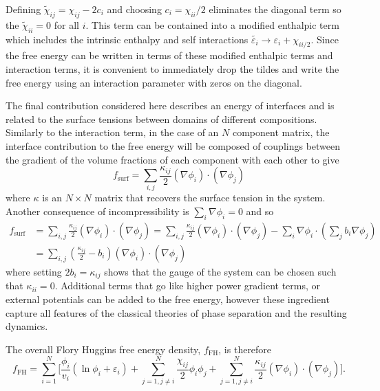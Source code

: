 Defining $\tilde{\chi}_{ij}=\chi_{ij}-2c_i$ and choosing $c_i = \chi_{ii}/2$ eliminates the diagonal term so the $\tilde{\chi}_{ii} = 0$ for all $i$. This term can be contained into a modified enthalpic term which includes the intrinsic enthalpy and self interactions $\tilde{\varepsilon_i} \rightarrow \varepsilon_i + \chi_{ii/2}$. Since the free energy can be written in terms of these modified enthalpic terms and interaction terms, it is convenient to immediately drop the tildes and write the free energy using an interaction parameter with zeros on the diagonal.

The final contribution considered here describes an energy of interfaces and is related to the surface tensions between domains of different compositions. Similarly to the interaction term, in the case of an $N$ component matrix, the interface contribution to the free energy will be composed of couplings between the gradient of the volume fractions of each component with each other to give
\begin{equation}
    f_\text{surf} = \sum_{i, j}\frac{\kappa_{ij}}{2}(\nabla\phi_i)\cdot(\nabla\phi_j)
\end{equation}
where $\kappa$ is an $N \times N$ matrix that recovers the surface tension in the system. Another consequence of incompressibility is $\sum_{i}\nabla\phi_i = 0$ and so
\begin{equation}
\begin{split}
    f_\text{surf} &= \sum_{i,j}\frac{\kappa_{ij}}{2}\left(\nabla\phi_i\right)\cdot\left(\nabla\phi_j\right) = \sum_{i,j}\frac{\kappa_{ij}}{2}\left(\nabla\phi_i\right)\cdot\left(\nabla\phi_j\right) - \sum_{i}\nabla\phi_i\cdot\left(\sum_j b_i\nabla\phi_j\right) \\
    &= \sum_{i,j}\left(\frac{\kappa_{ij}}{2} - b_i \right)\left(\nabla\phi_i\right)\cdot\left(\nabla\phi_j\right)
\end{split}
\end{equation}
where setting $2b_i = \kappa_{ij}$ shows that the gauge of the system can be chosen such that $\kappa_{ii} = 0$. Additional terms that go like higher power gradient terms, or external potentials can be added to the free energy, however these ingredient capture all features of the classical theories of phase separation and the resulting dynamics.

The overall Flory Huggins free energy density, $f_\text{FH}$, is therefore
\begin{equation}
    f_\text{FH} = \sum_{i=1}^{N}\Bigg[\frac{\phi_i}{v_i}(\ln\phi_i+\varepsilon_i)+\sum_{j=1, j\neq i}^{N}\frac{\chi_{ij}}{2}\phi_i\phi_j + \sum_{j=1, j\neq i}^{N} \frac{\kappa_{ij}}{2}(\nabla\phi_i)\cdot(\nabla\phi_j)\Bigg].
    \label{fh_gen}
\end{equation}

